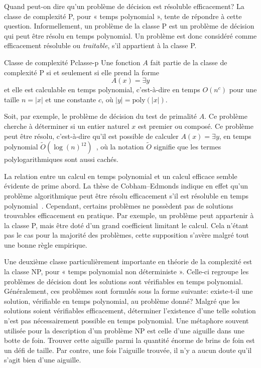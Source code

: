 Quand peut-on dire qu'un problème de décision est résoluble efficacement? La classe de complexité \textsf{P}, pour « temps polynomial », tente de répondre à cette question. Informellement, un problème de la classe \textsf{P} est un problème de décision qui peut être résolu en temps polynomial. Un problème est donc considéré comme efficacement résoluble ou \textit{traitable}, s'il appartient à la classe \textsf{P}. 

\begin{maindefinition}{Classe de complexité \textsf{P}}{classe-p}
    Une fonction $A$ fait partie de la classe de complexité \textsf{P} si et seulement si elle prend la forme 
    \begin{equation*}
        A(x)=\exists y
    \end{equation*}
    et elle est calculable en temps polynomial, c’est-à-dire en temps $O(n^{c})$ pour une taille $n = \lvert x \rvert$ et une constante $c$, où $\lvert y \rvert = \mathrm{poly}(\lvert x \rvert )$.
\end{maindefinition}

Soit, par exemple, le problème de décision du test de primalité $A$. Ce problème cherche à déterminer si un entier naturel $x$ est premier ou composé. Ce problème peut être résolu, c'est-à-dire qu'il est possible de calculer $A(x)=\exists y$, en temps polynomial $\tilde{O}(\log(n)^{12})$~\cite{PRIMESAnnalsMathematics}, où la notation $\tilde{O}$ signifie que les termes polylogarithmiques sont aussi cachés. 

La relation entre un calcul en temps polynomial et un calcul efficace semble évidente de prime abord. La thèse de Cobham–Edmonds indique en effet qu'un problème algorithmique peut être résolu efficacement s'il est résoluble en temps polynomial~\cite{cobhamIntrinsicComputationalDifficulty1965, edmondsPathsTreesFlowers1965}. Cependant, certains problèmes ne possèdent pas de solutions trouvables efficacement en pratique. Par exemple, un problème peut appartenir à la classe \textsf{P}, mais être doté d'un grand coefficient limitant le calcul. Cela n'étant pas le cas pour la majorité des problèmes, cette supposition s'avère malgré tout une bonne règle empirique. 

Une deuxième classe particulièrement importante en théorie de la complexité est la classe \textsf{NP}, pour « temps polynomial non déterministe ». Celle-ci regroupe les problèmes de décision dont les solutions sont vérifiables en temps polynomial. Généralement, ces problèmes sont formulés sous la forme suivante: existe-t-il une solution, vérifiable en temps polynomial, au problème donné? Malgré que les solutions soient vérifiables efficacement, déterminer l'existence d'une telle solution n'est pas nécessairement possible en temps polynomial. Une métaphore souvent utilisée pour la description d'un problème \textsf{NP} est celle d'une aiguille dans une botte de foin. Trouver cette aiguille parmi la quantité énorme de brins de foin est un défi de taille. Par contre, une fois l'aiguille trouvée, il n'y a aucun doute qu'il s'agit bien d'une aiguille. 


